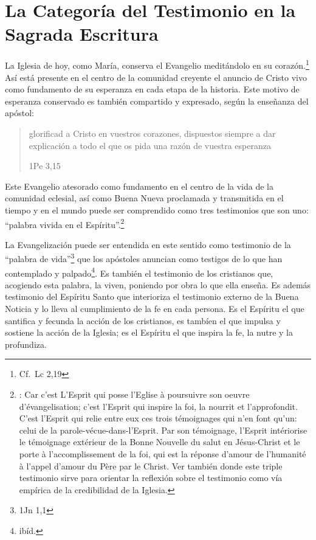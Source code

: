 \section{La Categoría del Testimonio en la Sagrada Escritura}

La Iglesia de hoy, como María, conserva el Evangelio meditándolo en su
corazón.\footnote{Cf.~Lc 2,19} Así está presente en el centro de la comunidad
creyente el anuncio de Cristo vivo como fundamento de su esperanza en cada etapa
de la historia. Este motivo de esperanza conservado es también compartido y
expresado, según la enseñanza del apóstol:
\blockquote[1Pe 3,15]{glorificad a Cristo en vuestros corazones, dispuestos
  siempre a dar explicación a todo el que os pida una razón de vuestra
  esperanza}.

Este Evangelio atesorado como fundamento en el centro de la vida de la comunidad
eclesial, así como Buena Nueva proclamada y transmitida en el tiempo y en el
mundo puede ser comprendido como tres testimonios que son uno: \enquote{palabra
  vivida en el Espíritu}.\footnote{\cite[Cf.~][110]{latourelle1975et}: Car c'est
  L'Esprit qui posse l'Eglise à poursuivre son oeuvre d'évangelisation; c'est
  l'Esprit qui inspire la foi, la nourrit et l'approfondit. C'est l'Esprit qui
  relie entre eux ces trois témoignages qui n'en font qu'un: celui de la
  parole-vécue-dans-l'Esprit. Par son témoignage, l'Esprit intériorise le
  témoignage extérieur de la Bonne Nouvelle du salut en Jésus-Christ et le porte
  à l'accomplissement de la foi, qui est la réponse d'amour de l'humanité à
  l'appel d'amour du Père par le Christ. Ver también \cite[582]{ninot2009tf}
  donde este triple testimonio sirve para orientar la reflexión sobre el
  testimonio como vía empírica de la credibilidad de la Iglesia.}

La Evangelización puede ser entendida en este sentido como testimonio de la
\enquote{palabra de vida}\footnote{1Jn 1,1} que los apóstoles anuncian como
testigos de lo que han contemplado y palpado\footnote{ibíd.}. Es también el
testimonio de los cristianos que, acogiendo esta palabra, la viven, poniendo por
obra lo que ella enseña. Es además testimonio del Espíritu Santo que interioriza
el testimonio externo de la Buena Noticia y lo lleva al cumplimiento de la fe en
cada persona.\autocite[Cf.~][110]{latourelle1975et} Es el Espíritu el que
santifica y fecunda la acción de los cristianos, es tambíen el que impulsa y
sostiene la acción de la Iglesia; es el Espíritu el que inspira la fe, la nutre
y la profundiza.\autocite[Cf.~][110]{latourelle1975et}

